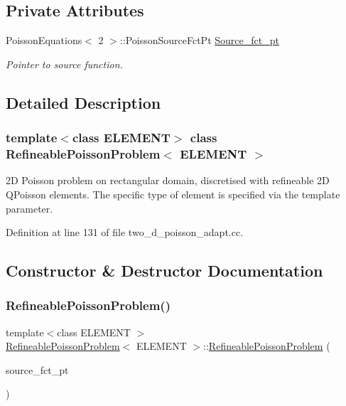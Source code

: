 \subsection*{Private Attributes}
\begin{DoxyCompactItemize}
\item 
Poisson\+Equations$<$ 2 $>$\+::Poisson\+Source\+Fct\+Pt \hyperlink{classRefineablePoissonProblem_abaf852221a8673550f96bbb507d6b05a}{Source\+\_\+fct\+\_\+pt}
\begin{DoxyCompactList}\small\item\em Pointer to source function. \end{DoxyCompactList}\end{DoxyCompactItemize}


\subsection{Detailed Description}
\subsubsection*{template$<$class E\+L\+E\+M\+E\+NT$>$\newline
class Refineable\+Poisson\+Problem$<$ E\+L\+E\+M\+E\+N\+T $>$}

2D Poisson problem on rectangular domain, discretised with refineable 2D Q\+Poisson elements. The specific type of element is specified via the template parameter. 

Definition at line 131 of file two\+\_\+d\+\_\+poisson\+\_\+adapt.\+cc.



\subsection{Constructor \& Destructor Documentation}
\mbox{\label{classRefineablePoissonProblem_a019ec586c38163e04e177de92503c02f}} 
\subsubsection{\texorpdfstring{Refineable\+Poisson\+Problem()}{RefineablePoissonProblem()}}
{\footnotesize\ttfamily template$<$class E\+L\+E\+M\+E\+NT $>$ \\
\hyperlink{classRefineablePoissonProblem}{Refineable\+Poisson\+Problem}$<$ E\+L\+E\+M\+E\+NT $>$\+::\hyperlink{classRefineablePoissonProblem}{Refineable\+Poisson\+Problem} (\begin{DoxyParamCaption}\item[{Poisson\+Equations$<$ 2 $>$\+::Poisson\+Source\+Fct\+Pt}]{source\+\_\+fct\+\_\+pt }\end{DoxyParamCaption})}



